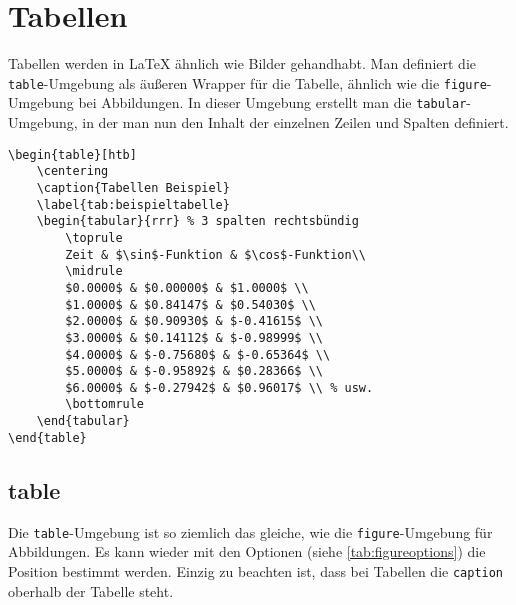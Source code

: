 \section{Tabellen}
Tabellen werden in \LaTeX{} ähnlich wie Bilder gehandhabt. Man definiert die \verb|table|-Um\-ge\-bung als äußeren Wrapper für die Tabelle, ähnlich wie die \verb|figure|-Um\-ge\-bung bei Abbildungen.
In dieser Umgebung erstellt man die \verb|tabular|-Umgebung, in der man nun den Inhalt der einzelnen Zeilen und Spalten definiert.
\begin{lstlisting}[style=latex]
\begin{table}[htb]
	\centering
	\caption{Tabellen Beispiel}
	\label{tab:beispieltabelle}
	\begin{tabular}{rrr} % 3 spalten rechtsbündig
		\toprule
		Zeit & $\sin$-Funktion & $\cos$-Funktion\\
		\midrule
		$0.0000$ & $0.00000$ & $1.0000$ \\
		$1.0000$ & $0.84147$ & $0.54030$ \\
		$2.0000$ & $0.90930$ & $-0.41615$ \\
		$3.0000$ & $0.14112$ & $-0.98999$ \\
		$4.0000$ & $-0.75680$ & $-0.65364$ \\
		$5.0000$ & $-0.95892$ & $0.28366$ \\
		$6.0000$ & $-0.27942$ & $0.96017$ \\ % usw.
		\bottomrule
	\end{tabular}
\end{table}
\end{lstlisting}

\subsection{table}
Die \verb|table|-Umgebung ist so ziemlich das gleiche, wie die \verb|figure|-Umgebung für Abbildungen. Es kann wieder mit den Optionen (siehe \autoref{tab:figureoptions}) die Position bestimmt werden. Einzig zu beachten ist, dass bei Tabellen die \verb|caption| oberhalb der Tabelle steht.

